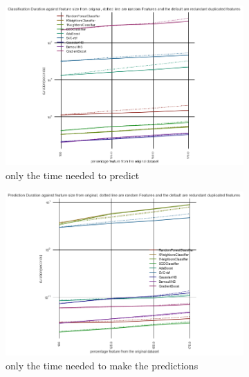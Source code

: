 \documentclass[a4paper,10pt]{article}
\begin{document}
\begin{figure}[H]
	\centering	
	\begin{subfigure}[b]{0.45\textwidth}
		\includegraphics[width=\textwidth]{images/scalability/FeatAddDupRandClass.png}
		\caption{only the time needed to predict }
		\label{fig:SADRC}
	\end{subfigure}
	\begin{subfigure}[b]{0.45\textwidth}
		\includegraphics[width=\textwidth]{images/scalability/FeatAddDupRandPred.png}
		\caption{only the time needed to make the predictions}
		\label{fig:SADRP}
	\end{subfigure}
	\begin{subfigure}[b]{0.45\textwidth}

\end{subfigure}
\end{figure}
\end{document}

